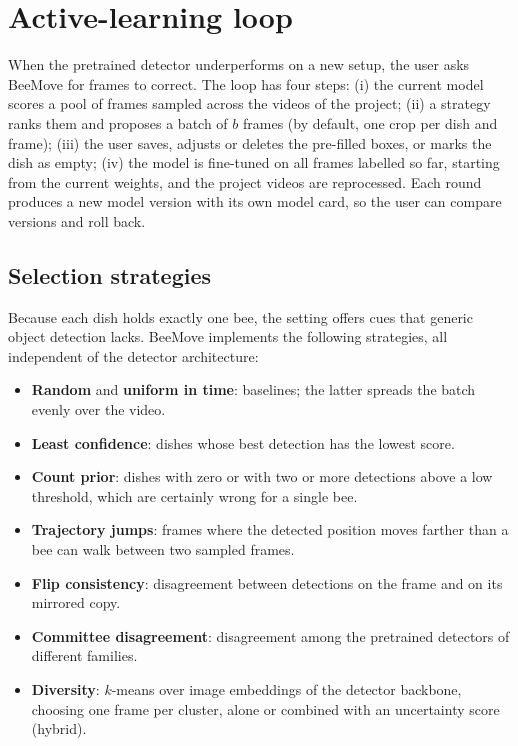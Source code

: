 \documentclass[pdflatex,sn-basic,Numbered]{sn-jnl}
\newcommand{\beemove}{BeeMove}
\theoremstyle{thmstyleone}%
\begin{document}
\section{Active-learning loop}\label{sec:al}

When the pretrained detector underperforms on a new setup, the user asks \beemove{} for frames to correct. The loop has four steps: (i) the current model scores a pool of frames sampled across the videos of the project; (ii) a strategy ranks them and proposes a batch of $b$ frames (by default, one crop per dish and frame); (iii) the user saves, adjusts or deletes the pre-filled boxes, or marks the dish as empty; (iv) the model is fine-tuned on all frames labelled so far, starting from the current weights, and the project videos are reprocessed. Each round produces a new model version with its own model card, so the user can compare versions and roll back.

\subsection{Selection strategies}\label{sec:strategies}

Because each dish holds exactly one bee, the setting offers cues that generic object detection lacks. \beemove{} implements the following strategies, all independent of the detector architecture:

\begin{itemize}
\item \textbf{Random} and \textbf{uniform in time}: baselines; the latter spreads the batch evenly over the video.
\item \textbf{Least confidence}: dishes whose best detection has the lowest score.
\item \textbf{Count prior}: dishes with zero or with two or more detections above a low threshold, which are certainly wrong for a single bee.
\item \textbf{Trajectory jumps}: frames where the detected position moves farther than a bee can walk between two sampled frames.
\item \textbf{Flip consistency}: disagreement between detections on the frame and on its mirrored copy.
\item \textbf{Committee disagreement}: disagreement among the pretrained detectors of different families.
\item \textbf{Diversity}: $k$-means over image embeddings of the detector backbone, choosing one frame per cluster, alone or combined with an uncertainty score (hybrid).
\end{itemize}
\end{document}

